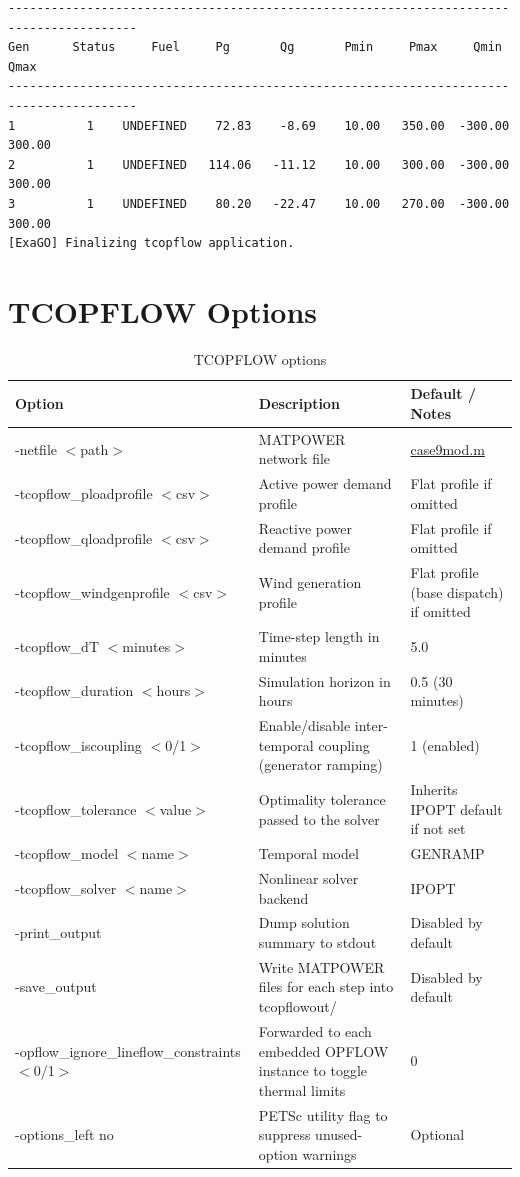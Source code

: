 \begin{lstlisting}
----------------------------------------------------------------------------------------
Gen      Status     Fuel     Pg       Qg       Pmin     Pmax     Qmin     Qmax  
----------------------------------------------------------------------------------------
1          1    UNDEFINED    72.83    -8.69    10.00   350.00  -300.00   300.00
2          1    UNDEFINED   114.06   -11.12    10.00   300.00  -300.00   300.00
3          1    UNDEFINED    80.20   -22.47    10.00   270.00  -300.00   300.00
[ExaGO] Finalizing tcopflow application.
\end{lstlisting}

\section{TCOPFLOW Options}

\begin{table}[H]
  \caption{TCOPFLOW options}
  \small
  \begin{tabular}{|p{}|p{}|p{}|}
    \hline
    \textbf{Option} & \textbf{Description} & \textbf{Default / Notes} \\ \hline
    -netfile $<$path$>$ & MATPOWER network file & \href{https://github.com/ORNL/ExaGO/tree/develop/datafiles/case9/case9mod.m}{case9mod.m} \\ \hline
    -tcopflow\_ploadprofile $<$csv$>$ & Active power demand profile & Flat profile if omitted \\ \hline
    -tcopflow\_qloadprofile $<$csv$>$ & Reactive power demand profile & Flat profile if omitted \\ \hline
    -tcopflow\_windgenprofile $<$csv$>$ & Wind generation profile & Flat profile (base dispatch) if omitted \\ \hline
    -tcopflow\_dT $<$minutes$>$ & Time-step length in minutes & 5.0 \\ \hline
    -tcopflow\_duration $<$hours$>$ & Simulation horizon in hours & 0.5 (30 minutes) \\ \hline
    -tcopflow\_iscoupling $<$0/1$>$ & Enable/disable inter-temporal coupling (generator ramping) & 1 (enabled) \\ \hline
    -tcopflow\_tolerance $<$value$>$ & Optimality tolerance passed to the solver & Inherits IPOPT default if not set \\ \hline
    -tcopflow\_model $<$name$>$ & Temporal model & GENRAMP \\ \hline
    -tcopflow\_solver $<$name$>$ & Nonlinear solver backend & IPOPT \\ \hline
    -print\_output & Dump solution summary to stdout & Disabled by default \\ \hline
    -save\_output & Write MATPOWER files for each step into tcopflowout/ & Disabled by default \\ \hline
    -opflow\_ignore\_lineflow\_constraints $<$0/1$>$ & Forwarded to each embedded OPFLOW instance to toggle thermal limits & 0 \\ \hline
    -options\_left no & PETSc utility flag to suppress unused-option warnings & Optional \\ \hline
  \end{tabular}
  \label{tab:tcopflow_options}
\end{table}
